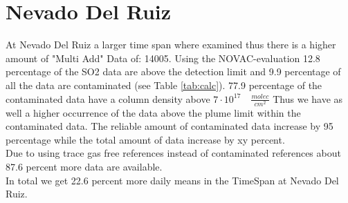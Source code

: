 \documentclass  [
  paper    = a4,
  BCOR     = 10mm,
  twoside,
  fontsize = 12pt,
  fleqn,
  toc      = bibnumbered,
  toc      = listofnumbered,
  numbers  = noendperiod,
  headings = normal,
  listof   = leveldown,
  version  = 3.03
]                                       {scrreprt}
\begin{document}
\section{Nevado Del Ruiz}
At Nevado Del Ruiz a larger time span where examined thus there is a higher amount of "Multi Add" Data of: 14005.
Using the NOVAC-evaluation 12.8 percentage of the SO2 data are above the detection limit and 9.9 percentage of all the data are contaminated (see  Table \ref{tab:calc}). 
77.9 percentage of the contaminated data have a   column density above $7\cdot10^{17}\quad \frac{molec}{cm^2}$ Thus we have as well a higher occurrence of the data above the plume limit within the contaminated data. 
The reliable amount of contaminated data increase by 95 percentage while the total amount of data increase by xy percent.\\
Due to using trace gas free references instead of contaminated references about 87.6 percent more data are available. \\
In total we get 22.6 percent more daily means in the TimeSpan at Nevado Del Ruiz.\\
\\
%
%
%
\end{document}

